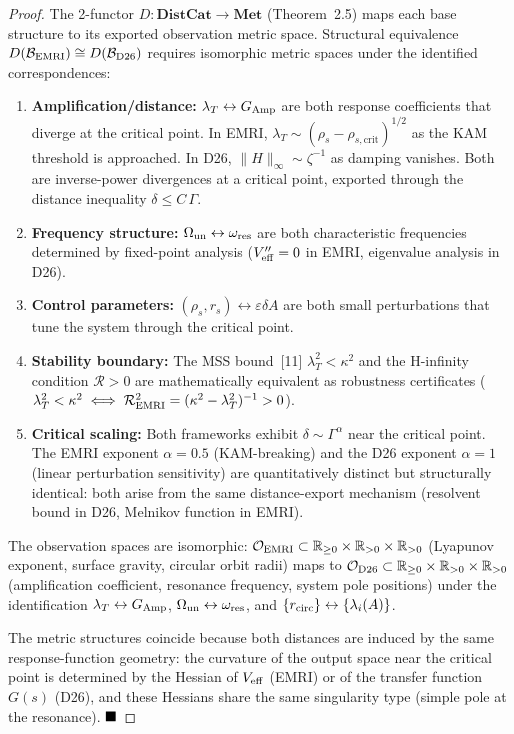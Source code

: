 \documentclass[
]{article}
\begin{document}
\begin{proof}
The 2-functor $D: \mathbf{DistCat} \to \mathbf{Met}$ (Theorem~2.5) maps each base structure to its exported observation metric space. Structural equivalence $D(\mathcal{B}_{\rm EMRI}) \cong D(\mathcal{B}_{\rm D26})$ requires isomorphic metric spaces under the identified correspondences:
\begin{enumerate}
\item \textbf{Amplification/distance:} $\lambda_T \leftrightarrow G_{\rm Amp}$ are both response coefficients that diverge at the critical point. In EMRI, $\lambda_T \sim (\rho_s - \rho_{s,\text{crit}})^{1/2}$ as the KAM threshold is approached. In D26, $\|H\|_\infty \sim \zeta^{-1}$ as damping vanishes. Both are inverse-power divergences at a critical point, exported through the distance inequality $\delta \leq C\,\Gamma$.
\item \textbf{Frequency structure:} $\Omega_{\rm un} \leftrightarrow \omega_{\rm res}$ are both characteristic frequencies determined by fixed-point analysis ($V_{\rm eff}'' = 0$ in EMRI, eigenvalue analysis in D26).
\item \textbf{Control parameters:} $(\rho_s, r_s) \leftrightarrow \varepsilon\delta A$ are both small perturbations that tune the system through the critical point.
\item \textbf{Stability boundary:} The MSS bound~[11] $\lambda_T^2 < \kappa^2$ and the H-infinity condition $\mathcal{R} > 0$ are mathematically equivalent as robustness certificates ($\lambda_T^2 < \kappa^2 \iff \mathcal{R}_{\rm EMRI}^2 = (\kappa^2 - \lambda_T^2)^{-1} > 0$).
\item \textbf{Critical scaling:} Both frameworks exhibit $\delta \sim \Gamma^\alpha$ near the critical point. The EMRI exponent $\alpha = 0.5$ (KAM-breaking) and the D26 exponent $\alpha = 1$ (linear perturbation sensitivity) are quantitatively distinct but structurally identical: both arise from the same distance-export mechanism (resolvent bound in D26, Melnikov function in EMRI).
\end{enumerate}

The observation spaces are isomorphic: $\mathcal{O}_{\rm EMRI} \subset \mathbb{R}_{\geq 0} \times \mathbb{R}_{>0} \times \mathbb{R}_{>0}$ (Lyapunov exponent, surface gravity, circular orbit radii) maps to $\mathcal{O}_{\rm D26} \subset \mathbb{R}_{\geq 0} \times \mathbb{R}_{>0} \times \mathbb{R}_{>0}$ (amplification coefficient, resonance frequency, system pole positions) under the identification $\lambda_T \leftrightarrow G_{\rm Amp}$, $\Omega_{\rm un} \leftrightarrow \omega_{\rm res}$, and $\{r_{\rm circ}\} \leftrightarrow \{\lambda_i(A)\}$.

The metric structures coincide because both distances are induced by the same response-function geometry: the curvature of the output space near the critical point is determined by the Hessian of $V_{\rm eff}$ (EMRI) or of the transfer function $G(s)$ (D26), and these Hessians share the same singularity type (simple pole at the resonance). $\hfill\blacksquare$
\end{proof}
\end{document}
